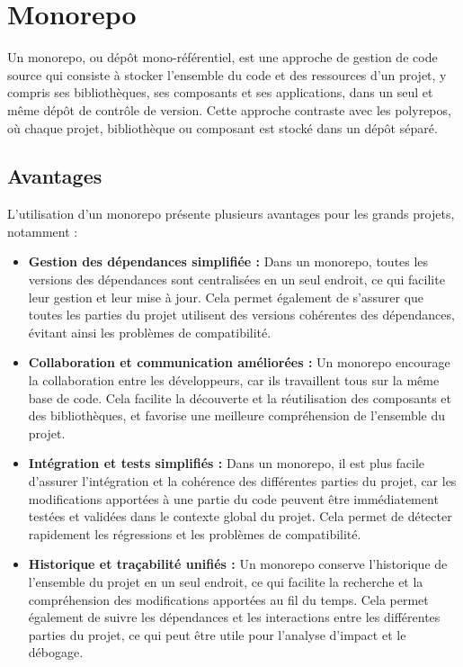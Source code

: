 \section{Monorepo}
Un monorepo, ou dépôt mono-référentiel, est une approche de gestion de code source qui consiste à stocker l'ensemble du code et des ressources d'un projet, y compris ses bibliothèques, ses composants et ses applications, dans un seul et même dépôt de contrôle de version. Cette approche contraste avec les polyrepos, où chaque projet, bibliothèque ou composant est stocké dans un dépôt séparé.

\subsection{Avantages}

L'utilisation d'un monorepo présente plusieurs avantages pour les grands projets, notamment :

\begin{itemize}
    \item \textbf{Gestion des dépendances simplifiée :} Dans un monorepo, toutes les versions des dépendances sont centralisées en un seul endroit, ce qui facilite leur gestion et leur mise à jour. Cela permet également de s'assurer que toutes les parties du projet utilisent des versions cohérentes des dépendances, évitant ainsi les problèmes de compatibilité.
    \item \textbf{Collaboration et communication améliorées :} Un monorepo encourage la collaboration entre les développeurs, car ils travaillent tous sur la même base de code. Cela facilite la découverte et la réutilisation des composants et des bibliothèques, et favorise une meilleure compréhension de l'ensemble du projet.
    \item \textbf{Intégration et tests simplifiés :} Dans un monorepo, il est plus facile d'assurer l'intégration et la cohérence des différentes parties du projet, car les modifications apportées à une partie du code peuvent être immédiatement testées et validées dans le contexte global du projet. Cela permet de détecter rapidement les régressions et les problèmes de compatibilité.
    \item \textbf{Historique et traçabilité unifiés :} Un monorepo conserve l'historique de l'ensemble du projet en un seul endroit, ce qui facilite la recherche et la compréhension des modifications apportées au fil du temps. Cela permet également de suivre les dépendances et les interactions entre les différentes parties du projet, ce qui peut être utile pour l'analyse d'impact et le débogage.
\end{itemize}


